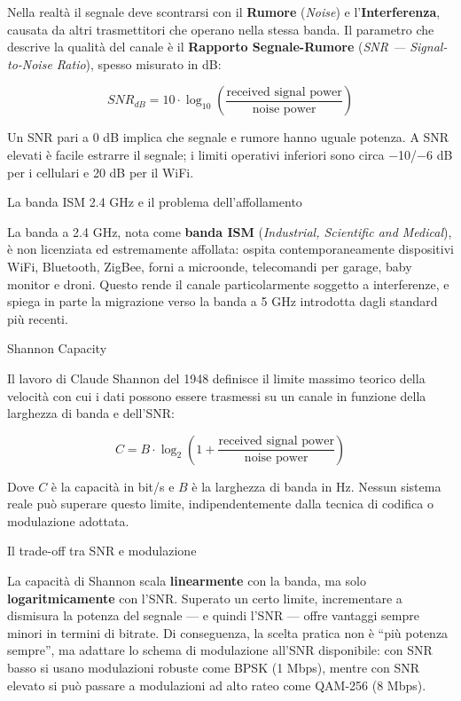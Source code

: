 \documentclass[
  italian,
  openany]{book}
\begin{document}
Nella realtà il segnale deve scontrarsi con il \textbf{Rumore}
(\emph{Noise}) e l'\textbf{Interferenza}, causata da altri trasmettitori
che operano nella stessa banda. Il parametro che descrive la qualità del
canale è il \textbf{Rapporto Segnale-Rumore} (\emph{SNR ---
Signal-to-Noise Ratio}), spesso misurato in dB:

\[SNR_{dB}=10\cdot \log_{10}\left(\frac{\text{received signal power}}{\text{noise power}}\right)\]

Un SNR pari a 0 dB implica che segnale e rumore hanno uguale potenza. A
SNR elevati è facile estrarre il segnale; i limiti operativi inferiori
sono circa −10/−6 dB per i cellulari e 20 dB per il WiFi.

\begin{calloutnote}{La banda ISM 2.4 GHz e il problema dell’affollamento}

La banda a 2.4 GHz, nota come \textbf{banda ISM} (\emph{Industrial,
Scientific and Medical}), è non licenziata ed estremamente affollata:
ospita contemporaneamente dispositivi WiFi, Bluetooth, ZigBee, forni a
microonde, telecomandi per garage, baby monitor e droni. Questo rende il
canale particolarmente soggetto a interferenze, e spiega in parte la
migrazione verso la banda a 5 GHz introdotta dagli standard più recenti.

\end{calloutnote}

\begin{calloutdefinition}{Shannon Capacity}

Il lavoro di Claude Shannon del 1948 definisce il limite massimo teorico
della velocità con cui i dati possono essere trasmessi su un canale in
funzione della larghezza di banda e dell'SNR:

\[C = B \cdot \log_{2}\!\left(1 + \frac{\text{received signal power}}{\text{noise power}}\right)\]

Dove \(C\) è la capacità in bit/s e \(B\) è la larghezza di banda in Hz.
Nessun sistema reale può superare questo limite, indipendentemente dalla
tecnica di codifica o modulazione adottata.

\end{calloutdefinition}

\begin{callouttip}{Il trade-off tra SNR e modulazione}

La capacità di Shannon scala \textbf{linearmente} con la banda, ma solo
\textbf{logaritmicamente} con l'SNR. Superato un certo limite,
incrementare a dismisura la potenza del segnale --- e quindi l'SNR ---
offre vantaggi sempre minori in termini di bitrate. Di conseguenza, la
scelta pratica non è ``più potenza sempre'', ma adattare lo schema di
modulazione all'SNR disponibile: con SNR basso si usano modulazioni
robuste come BPSK (1 Mbps), mentre con SNR elevato si può passare a
modulazioni ad alto rateo come QAM-256 (8 Mbps).

\end{callouttip}
\end{document}
